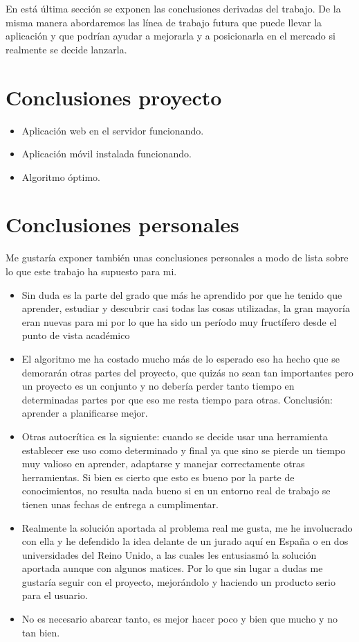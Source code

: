
En está última sección se exponen las conclusiones derivadas del trabajo. De la misma manera abordaremos las línea de trabajo futura que puede llevar la aplicación y que podrían ayudar a mejorarla y a posicionarla en el mercado si realmente se decide lanzarla.


  \section{Conclusiones proyecto}\label{conclusiones_proyecto}
  
\begin{itemize}
	\item Aplicación web en el servidor funcionando.
	\item Aplicación móvil instalada funcionando.
	\item Algoritmo óptimo.
\end{itemize}
  
  \section{Conclusiones personales}\label{conclusiones_personales}
	Me gustaría exponer también unas conclusiones personales a modo de lista sobre lo que este trabajo ha supuesto para mi.  
    
\begin{itemize}
	\item Sin duda es la parte del grado que más he aprendido por que he tenido que aprender, estudiar y descubrir casi todas las cosas utilizadas, la gran mayoría eran nuevas para mi por lo que ha sido un período muy fructífero desde el punto de vista académico
	\item El algoritmo me ha costado mucho más de lo esperado eso ha hecho que se demorarán otras partes del proyecto, que quizás no sean tan importantes pero un proyecto es un conjunto y no debería perder tanto tiempo en determinadas partes por que eso me resta tiempo para otras. Conclusión: aprender a planificarse mejor.
	\item Otras autocrítica es la siguiente: cuando se decide usar una herramienta establecer ese uso como determinado y final ya que sino se pierde un tiempo muy valioso en aprender, adaptarse y manejar correctamente otras herramientas. Si bien es cierto que esto es bueno por la parte de conocimientos, no resulta nada bueno si en un entorno real de trabajo se tienen unas fechas de entrega a cumplimentar.
	\item Realmente la solución aportada al problema real me gusta, me he involucrado con ella y he defendido la idea delante de un jurado aquí en España o en dos universidades del Reino Unido, a las cuales les entusiasmó la solución aportada aunque con algunos matices. Por lo que sin lugar a dudas me gustaría seguir con el proyecto, mejorándolo y haciendo un producto serio para el usuario.
	\item No es necesario abarcar tanto, es mejor hacer poco y bien que mucho y no tan bien.
\end{itemize}
  
